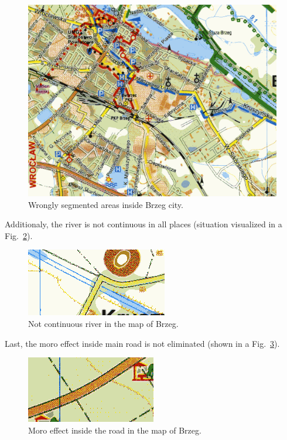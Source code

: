 \documentclass[a4paper,onecolumn,oneside,12pt]{memoir}
\begin{document}
\begin{figure}[!ht]
\begin{center}
\includegraphics[scale=0.25]{images/badBrzeg.png}
\caption{Wrongly segmented areas inside Brzeg city.}
\label{badBrzeg}
\end{center}
\end{figure}

Additionaly, the river is not continuous in all places (situation visualized in a 
Fig.~\ref{badBrzegRiver}).

\begin{figure}[!ht]
\begin{center}
\includegraphics[scale=1.0]{images/badBrzegRiver.png}
\caption{Not continuous river in the map of Brzeg.}
\label{badBrzegRiver}
\end{center}
\end{figure}

Last, the moro effect inside main road is not eliminated (shown in a Fig.~\ref{badBrzegRoad}).

\begin{figure}[!ht]
\begin{center}
\includegraphics[scale=1.0]{images/badBrzegRoad.png}
\caption{Moro effect inside the road in the map of Brzeg.}
\label{badBrzegRoad}
\end{center}
\end{figure}
\end{document}
